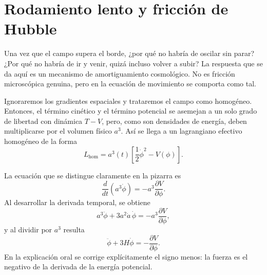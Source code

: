 \begin{classroomqa}
\end{classroomqa}

\section{Rodamiento lento y fricción de Hubble}

Una vez que el campo supera el borde, ¿por qué no habría de oscilar sin parar? ¿Por qué no habría de ir y venir, quizá incluso volver a subir? La respuesta que se da aquí es un mecanismo de amortiguamiento cosmológico. No es fricción microscópica genuina, pero en la ecuación de movimiento se comporta como tal.

Ignoraremos los gradientes espaciales y trataremos el campo como homogéneo. Entonces, el término cinético y el término potencial se asemejan a un solo grado de libertad con dinámica \(T-V\), pero, como son densidades de energía, deben multiplicarse por el volumen físico \(a^3\). Así se llega a un lagrangiano efectivo homogéneo de la forma
\begin{equation}
L_{\mathrm{hom}}=a^3(t)\left[\frac12\dot\phi^2-V(\phi)\right].
\end{equation}

La ecuación que se distingue claramente en la pizarra es
\begin{equation}
\frac{d}{dt}\left(a^3\dot\phi\right)=-a^3\frac{\partial V}{\partial\phi}.
\end{equation}
Al desarrollar la derivada temporal, se obtiene
\begin{equation}
a^3\ddot\phi+3a^2\dot a\,\dot\phi=-a^3\frac{\partial V}{\partial\phi},
\end{equation}
y al dividir por \(a^3\) resulta
\begin{equation}
\ddot\phi+3H\dot\phi=-\frac{\partial V}{\partial\phi}.
\end{equation}
En la explicación oral se corrige explícitamente el signo menos: la fuerza es el negativo de la derivada de la energía potencial.


